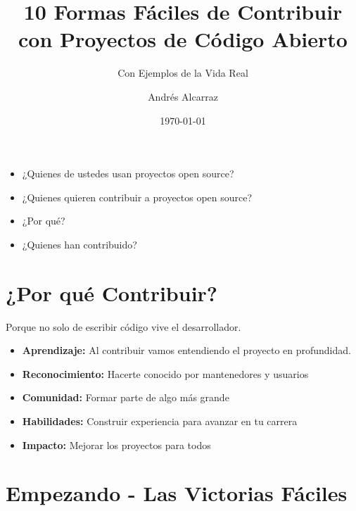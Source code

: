 \documentclass{presentacion}
\title[Contribuir en Open Source] 
{10 Formas Fáciles de Contribuir con Proyectos de Código Abierto}
\subtitle{Con Ejemplos de la Vida Real}
\author{Andrés Alcarraz}
\date{\today}
\begin{document}
\frame{\titlepage}
\begin{frame}
 \begin{itemize} [<+->]
  \item ¿Quienes de ustedes usan proyectos open source?
  \item ¿Quienes quieren contribuir a proyectos open source? 
  \item ¿Por qué?
  \item ¿Quienes han contribuido?
 \end{itemize}

\end{frame}

\section{¿Por qué Contribuir?}
\begin{frame}
    Porque no solo de escribir código vive el desarrollador.
    \pause
    \begin{itemize}[<+->]
        \item \textbf{Aprendizaje:} Al contribuir vamos entendiendo el proyecto en profundidad.
        \item \textbf{Reconocimiento:} Hacerte conocido por mantenedores y usuarios
        \item \textbf{Comunidad:} Formar parte de algo más grande
        \item \textbf{Habilidades:} Construir experiencia para avanzar en tu carrera
        \item \textbf{Impacto:} Mejorar los proyectos para todos
    \end{itemize}
    \vspace{1em}
\end{frame}

\section{Empezando - Las Victorias Fáciles}
\end{document}
